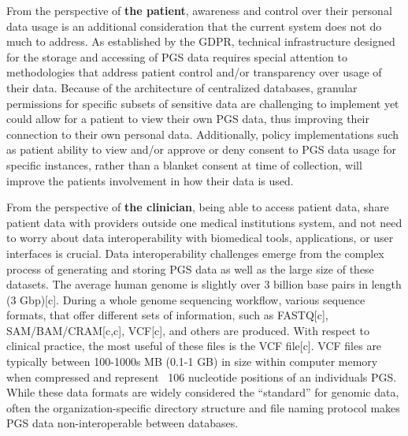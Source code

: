 \documentclass{article}
\begin{document}
From the perspective of \textbf{the patient}, awareness and control over their personal data usage is an additional consideration that the current system does not do much to address. As established by the GDPR, technical infrastructure designed for the storage and accessing of PGS data requires special attention to methodologies that address patient control and/or transparency over usage of their data. Because of the architecture of centralized databases, granular permissions for specific subsets of sensitive data are challenging to implement yet could allow for a patient to view their own PGS data, thus improving their connection to their own personal data. Additionally, policy implementations such as patient ability to view and/or approve or deny consent to PGS data usage for specific instances, rather than a blanket consent at time of collection, will improve the patient\textquotesingle s involvement in how their data is used. 

From the perspective of \textbf{the clinician}, being able to access patient data, share patient data with providers outside one medical institution\textquotesingle s system, and not need to worry about data interoperability with biomedical tools, applications, or user interfaces is crucial. Data interoperability challenges emerge from the complex process of generating and storing PGS data as well as the large size of these datasets. The average human genome is slightly over 3 billion base pairs in length (3 Gbp)[c]. During a whole genome sequencing workflow, various sequence formats, that offer different sets of information, such as FASTQ[c], SAM/BAM/CRAM[c,c], VCF[c], and others are produced. With respect to clinical practice, the most useful of these files is the VCF file[c]. VCF files are typically between 100-1000s MB (0.1-1 GB) in size within computer memory when compressed and represent ~106 nucleotide positions of an individual\textquotesingle s PGS. While these data formats are widely considered the “standard” for genomic data, often the organization-specific directory structure and file naming protocol makes PGS data non-interoperable between databases. 
\end{document}
